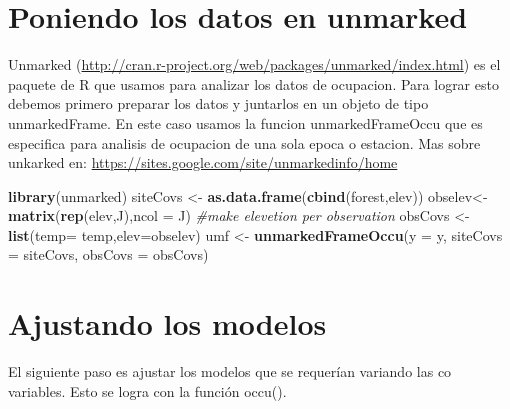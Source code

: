 \documentclass[]{book}
\newenvironment{Shaded}{\begin{snugshade}}{\end{snugshade}}
\newcommand{\KeywordTok}[1]{\textcolor[rgb]{0.13,0.29,0.53}{\textbf{{#1}}}}
\newcommand{\DataTypeTok}[1]{\textcolor[rgb]{0.13,0.29,0.53}{{#1}}}
\newcommand{\StringTok}[1]{\textcolor[rgb]{0.31,0.60,0.02}{{#1}}}
\newcommand{\CommentTok}[1]{\textcolor[rgb]{0.56,0.35,0.01}{\textit{{#1}}}}
\newcommand{\NormalTok}[1]{{#1}}
\begin{document}
\section{Poniendo los datos en
unmarked}\label{poniendo-los-datos-en-unmarked}

Unmarked
(\url{http://cran.r-project.org/web/packages/unmarked/index.html}) es el
paquete de R que usamos para analizar los datos de ocupacion. Para
lograr esto debemos primero preparar los datos y juntarlos en un objeto
de tipo unmarkedFrame. En este caso usamos la funcion unmarkedFrameOccu
que es especifica para analisis de ocupacion de una sola epoca o
estacion. Mas sobre unkarked en:
\url{https://sites.google.com/site/unmarkedinfo/home}

\begin{Shaded}
\begin{Highlighting}[]
\KeywordTok{library}\NormalTok{(unmarked)}
\NormalTok{siteCovs <-}\StringTok{ }\KeywordTok{as.data.frame}\NormalTok{(}\KeywordTok{cbind}\NormalTok{(forest,elev))}
\NormalTok{obselev<-}\KeywordTok{matrix}\NormalTok{(}\KeywordTok{rep}\NormalTok{(elev,J),}\DataTypeTok{ncol =} \NormalTok{J) }\CommentTok{#make elevetion per observation}
\NormalTok{obsCovs <-}\StringTok{ }\KeywordTok{list}\NormalTok{(}\DataTypeTok{temp=} \NormalTok{temp,}\DataTypeTok{elev=}\NormalTok{obselev)}
\NormalTok{umf <-}\StringTok{ }\KeywordTok{unmarkedFrameOccu}\NormalTok{(}\DataTypeTok{y =} \NormalTok{y, }\DataTypeTok{siteCovs =} \NormalTok{siteCovs, }\DataTypeTok{obsCovs =} \NormalTok{obsCovs)}
\end{Highlighting}
\end{Shaded}

\section{Ajustando los modelos}\label{ajustando-los-modelos}

El siguiente paso es ajustar los modelos que se requerían variando las
co variables. Esto se logra con la función occu().
\end{document}
